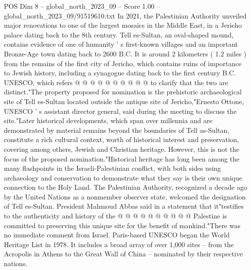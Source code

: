 \begin{textsample}{POS Dim 8 – global\_north\_2023\_09 – Score 1.00 – global\_north\_2023\_09/91519610.txt}
In 2021, the Palestinian Authority unveiled major renovations to one of the largest mosaics in the Middle East, in a Jericho palace dating back to the 8th century.
Tell es-Sultan, an oval-shaped mound, contains evidence of one of humanity ' s first-known villages and an important Bronze-Age town dating back to 2600 B.C.
It is around 2 kilometers ( 1.2 miles ) from the remains of the first city of Jericho, which contains ruins of importance to Jewish history, including a synagogue dating back to the first century B.C.
UNESCO, which refers @ @ @ @ @ @ @ @ @ @ to clarify that the two are distinct."The property proposed for nomination is the prehistoric archaeological site of Tell es-Sultan located outside the antique site of Jericho,"Ernesto Ottone, UNESCO ' s assistant director general, said during the meeting to discuss the site."Later historical developments, which span over millennia and are demonstrated by material remains beyond the boundaries of Tell as-Sultan, constitute a rich cultural context, worth of historical interest and preservation, covering among others, Jewish and Christian heritage.
However, this is not the focus of the proposed nomination."Historical heritage has long been among the many flashpoints in the Israeli-Palestinian conflict, with both sides using archaeology and conservation to demonstrate what they say is their own unique connection to the Holy Land.
The Palestinian Authority, recognized a decade ago by the United Nations as a nonmember observer state, welcomed the designation of Tell es-Sultan.
President Mahmoud Abbas said in a statement that it"testifies to the authenticity and history of the @ @ @ @ @ @ @ @ @ @ Palestine is committed to preserving this unique site for the benefit of mankind."There was no immediate comment from Israel.
Paris-based UNESCO began the World Heritage List in 1978.
It includes a broad array of over 1,000 sites -- from the Acropolis in Athens to the Great Wall of China -- nominated by their respective nations.

\end{textsample}
